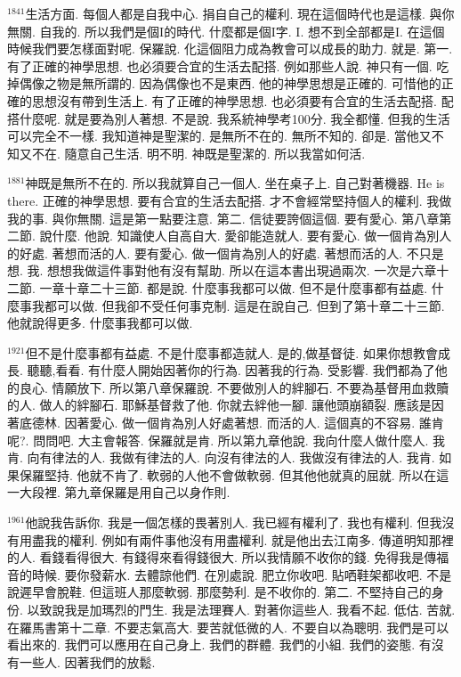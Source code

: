 \documentclass{book}
\begin{document}
$^{1841}$生活方面.
每個人都是自我中心.
捐自自己的權利.
現在這個時代也是這樣.
與你無關.
自我的.
所以我們是個I的時代.
什麼都是個I字.
I.
想不到全部都是I.
在這個時候我們要怎樣面對呢.
保羅說.
化這個阻力成為教會可以成長的助力.
就是.
第一.
有了正確的神學思想.
也必須要合宜的生活去配搭.
例如那些人說.
神只有一個.
吃掉偶像之物是無所謂的.
因為偶像也不是東西.
他的神學思想是正確的.
可惜他的正確的思想沒有帶到生活上.
有了正確的神學思想.
也必須要有合宜的生活去配搭.
配搭什麼呢.
就是要為別人著想.
不是說.
我系統神學考100分.
我全都懂.
但我的生活可以完全不一樣.
我知道神是聖潔的.
是無所不在的.
無所不知的.
卻是.
當他又不知又不在.
隨意自己生活.
明不明.
神既是聖潔的.
所以我當如何活.

$^{1881}$神既是無所不在的.
所以我就算自己一個人.
坐在桌子上.
自己對著機器.
He is there.
正確的神學思想.
要有合宜的生活去配搭.
才不會經常堅持個人的權利.
我做我的事.
與你無關.
這是第一點要注意.
第二.
信徒要誇個這個.
要有愛心.
第八章第二節.
說什麼.
他說.
知識使人自高自大.
愛卻能造就人.
要有愛心.
做一個肯為別人的好處.
著想而活的人.
要有愛心.
做一個肯為別人的好處.
著想而活的人.
不只是想.
我.
想想我做這件事對他有沒有幫助.
所以在這本書出現過兩次.
一次是六章十二節.
一章十章二十三節.
都是說.
什麼事我都可以做.
但不是什麼事都有益處.
什麼事我都可以做.
但我卻不受任何事克制.
這是在說自己.
但到了第十章二十三節.
他就說得更多.
什麼事我都可以做.

$^{1921}$但不是什麼事都有益處.
不是什麼事都造就人.
是的,做基督徒.
如果你想教會成長.
聽聽,看看.
有什麼人開始因著你的行為.
因著我的行為.
受影響.
我們都為了他的良心.
情願放下.
所以第八章保羅說.
不要做別人的絆腳石.
不要為基督用血救贖的人.
做人的絆腳石.
耶穌基督救了他.
你就去絆他一腳.
讓他頭崩額裂.
應該是因著底德林.
因著愛心.
做一個肯為別人好處著想.
而活的人.
這個真的不容易.
誰肯呢?.
問問吧.
大主會報答.
保羅就是肯.
所以第九章他說.
我向什麼人做什麼人.
我肯.
向有律法的人.
我做有律法的人.
向沒有律法的人.
我做沒有律法的人.
我肯.
如果保羅堅持.
他就不肯了.
軟弱的人他不會做軟弱.
但其他他就真的屈就.
所以在這一大段裡.
第九章保羅是用自己以身作則.

$^{1961}$他說我告訴你.
我是一個怎樣的畏著別人.
我已經有權利了.
我也有權利.
但我沒有用盡我的權利.
例如有兩件事他沒有用盡權利.
就是他出去江南多.
傳道明知那裡的人.
看錢看得很大.
有錢得來看得錢很大.
所以我情願不收你的錢.
免得我是傳福音的時候.
要你發薪水.
去體諒他們.
在別處說.
肥立你收吧.
貼哂鞋架都收吧.
不是說遲早會脫鞋.
但這班人那麼軟弱.
那麼勢利.
是不收你的.
第二.
不堅持自己的身份.
以致說我是加瑪烈的門生.
我是法理賽人.
對著你這些人.
我看不起.
低估.
苦就.
在羅馬書第十二章.
不要志氣高大.
要苦就低微的人.
不要自以為聰明.
我們是可以看出來的.
我們可以應用在自己身上.
我們的群體.
我們的小組.
我們的姿態.
有沒有一些人.
因著我們的放鬆.
\end{document}
